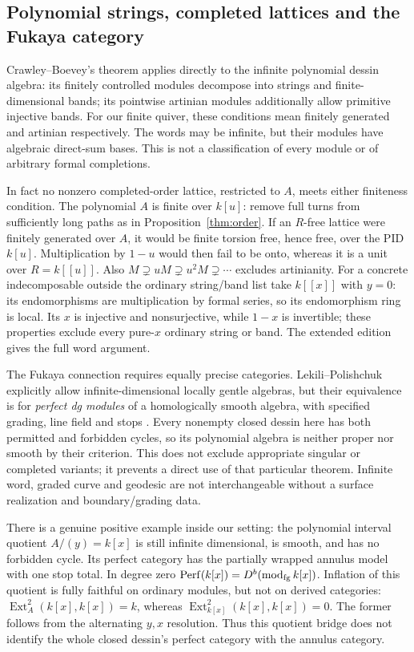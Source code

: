 \documentclass[11pt]{article}
\theoremstyle{definition}\newtheorem{definition}[theorem]{Definition}
\theoremstyle{remark}\newtheorem{remark}[theorem]{Remark}
\begin{document}
\subsection{Polynomial strings, completed lattices and the Fukaya category}
Crawley--Boevey's theorem \cite[Theorems1.1--1.4]{CrawleyBoeveyStrings} applies directly to the infinite polynomial dessin algebra: its finitely controlled modules decompose into strings and finite-dimensional bands; its pointwise artinian modules additionally allow primitive injective bands. For our finite quiver, these conditions mean finitely generated and artinian respectively. The words may be infinite, but their modules have algebraic direct-sum bases. This is not a classification of every module or of arbitrary formal completions.

In fact no nonzero completed-order lattice, restricted to $A$, meets either finiteness condition. The polynomial $A$ is finite over $k[u]$: remove full turns from sufficiently long paths as in Proposition~\ref{thm:order}. If an $R$-free lattice were finitely generated over $A$, it would be finite torsion free, hence free, over the PID $k[u]$. Multiplication by $1-u$ would then fail to be onto, whereas it is a unit over $R=k[[u]]$. Also $M\supsetneq uM\supsetneq u^2M\supsetneq\cdots$ excludes artinianity. For a concrete indecomposable outside the ordinary string/band list take $k[[x]]$ with $y=0$: its endomorphisms are multiplication by formal series, so its endomorphism ring is local. Its $x$ is injective and nonsurjective, while $1-x$ is invertible; these properties exclude every pure-$x$ ordinary string or band. The extended edition gives the full word argument.

The Fukaya connection requires equally precise categories. Lekili--Polishchuk explicitly allow infinite-dimensional locally gentle algebras, but their equivalence is for \emph{perfect dg modules} of a homologically smooth algebra, with specified grading, line field and stops \cite[Definition3.1.1, Lemma3.1.3, Theorem3.2.2]{LekiliPolishchuk}. Every nonempty closed dessin here has both permitted and forbidden cycles, so its polynomial algebra is neither proper nor smooth by their criterion. This does not exclude appropriate singular or completed variants; it prevents a direct use of that particular theorem. Infinite word, graded curve and geodesic are not interchangeable without a surface realization and boundary/grading data.

There is a genuine positive example inside our setting: the polynomial interval quotient $A/(y)=k[x]$ is still infinite dimensional, is smooth, and has no forbidden cycle. Its perfect category has the partially wrapped annulus model with one stop total. In degree zero $\operatorname{Perf}(k[x])=D^b(\operatorname{mod}_{\rm fg}k[x])$. Inflation of this quotient is fully faithful on ordinary modules, but not on derived categories: $\operatorname{Ext}_A^2(k[x],k[x])=k$, whereas $\operatorname{Ext}_{k[x]}^2(k[x],k[x])=0$. The former follows from the alternating $y,x$ resolution. Thus this quotient bridge does not identify the whole closed dessin's perfect category with the annulus category.
\end{document}
